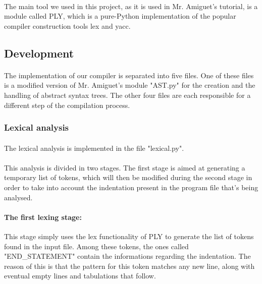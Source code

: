 \documentclass[12pt,a4paper]{article}
\begin{document}
\paragraph{}
The main tool we used in this project, as it is used in Mr. Amiguet's tutorial, is a module called PLY, which is a pure-Python implementation of the popular compiler construction tools lex and yacc.  

\subsection{Development}

\paragraph{}
The implementation of our compiler is separated into five files. One of these files is a modified version of Mr. Amiguet's module "AST.py" for the creation and the handling of abstract syntax trees. The other four files are each responsible for a different step of the compilation process. 

\subsubsection{Lexical analysis}

\paragraph{}
The lexical analysis is implemented in the file "lexical.py".

\paragraph{}
This analysis is divided in two stages. The first stage is aimed at generating a temporary list of tokens, which will then be modified during the second stage in order to take into account the indentation present in the program file that's being analysed.

\paragraph{The first lexing stage:}
This stage simply uses the lex functionality of PLY to generate the list of tokens found in the input file. Among these tokens, the ones called "END\_STATEMENT" contain the informations regarding the indentation. The reason of this is that the pattern for this token matches any new line, along with eventual empty lines and tabulations that follow.
\end{document}
